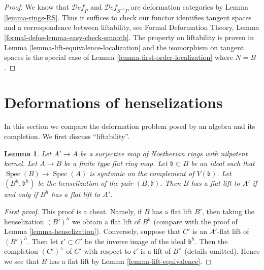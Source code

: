 \documentclass{stacks-project}
\theoremstyle{plain}
\newtheorem{lemma}[subsection]{Lemma}
\theoremstyle{definition}
\theoremstyle{remark}
\numberwithin{equation}{subsection}
\def\Spec{\mathop{\mathrm{Spec}}}
\def\Deformationcategory{\mathcal{D}\!\mathit{ef}}
\begin{document}
\begin{proof}
We know that $\Deformationcategory_P$ and $\Deformationcategory_{S^{-1}P}$
are deformation categories by Lemma \ref{lemma-rings-RS}.
Thus it suffices to check
our functor identifies tangent spaces and a correspondence
between liftability, see
Formal Deformation Theory, Lemma \ref{formal-defos-lemma-easy-check-smooth}.
The property on liftability is proven in
Lemma \ref{lemma-lift-equivalence-localization}
and the isomorphism on tangent spaces is the special case of
Lemma \ref{lemma-first-order-localization} where $N = B$.
\end{proof}



\section{Deformations of henselizations}
\label{section-compare-henselization}

\noindent
In this section we compare the deformation problem posed
by an algebra and its completion.
We first discuss ``liftability''.

\begin{lemma}
\label{lemma-lift-equivalence-henselization}
Let $A' \to A$ be a surjective map of Noetherian rings with nilpotent kernel.
Let $A \to B$ be a finite type flat ring map.
Let $\mathfrak b \subset B$ be an ideal such that
$\Spec(B) \to \Spec(A)$ is syntomic on the complement of $V(\mathfrak b)$.
Let $(B^h, \mathfrak b^h)$ be the henselization of the pair $(B, \mathfrak b)$.
Then $B$ has a flat lift to $A'$ if and only if $B^h$ has a flat lift to $A'$.
\end{lemma}

\begin{proof}[First proof]
This proof is a cheat. Namely, if $B$ has a flat lift $B'$, then
taking the henselization $(B')^h$ we obtain a flat lift of $B^h$
(compare with the proof of Lemma \ref{lemma-henselization}).
Conversely, suppose that $C'$ is an $A'$-flat lift of $(B')^h$.
Then let $\mathfrak c' \subset C'$ be the inverse image of the
ideal $\mathfrak b^h$. Then the completion $(C')^\wedge$ of
$C'$ with respect to $\mathfrak c'$ is a lift of $B^\wedge$ (details omitted).
Hence we see that $B$ has a flat lift by
Lemma \ref{lemma-lift-equivalence}.
\end{proof}
\end{document}
